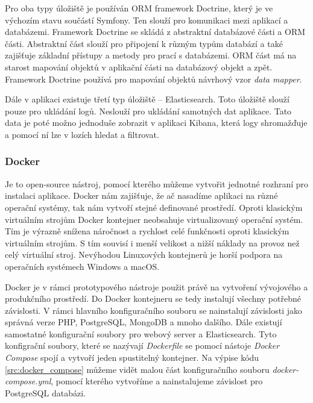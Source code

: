 \documentclass[czech,master,public,dept460,male,cpdeclaration,oneside]{diploma}
\begin{document}
Pro oba typy úložiště je používán ORM framework Doctrine, který je ve výchozím stavu součástí Symfony. Ten slouží pro komunikaci mezi aplikací a databázemi. Framework Doctrine se skládá z abstraktní databázové části  a ORM části. Abstraktní část slouží pro připojení k různým typům databází a také zajišťuje základní přístupy a metody pro prací s databázemi. ORM část má na starost mapování objektů v aplikační části na databázový objekt a zpět. Framework Doctrine používá pro mapování objektů návrhový vzor \textit{data mapper}.


Dále v aplikaci existuje třetí typ úložiště -- Elasticsearch. Toto úložiště slouží pouze pro ukládání logů. Neslouží pro ukládání samotných dat aplikace. Tato data je poté možno jednoduše zobrazit v aplikaci Kibana, která logy shromažďuje a pomocí ní lze v lozích hledat a filtrovat. 

\subsubsection{Docker}
\label{sec:docker}
Je to open-source nástroj, pomocí kterého můžeme vytvořit jednotné rozhraní pro instalaci aplikace. Docker nám zajišťuje, že ač nasadíme aplikaci na různé operační systémy, tak nám vytvoří stejné definované prostředí. Oproti klasickým virtuálním strojům Docker kontejner neobsahuje virtualizovaný operační systém. Tím je výrazně snížena náročnost a rychlost celé funkčnosti oproti klasickým virtuálním strojům. S tím souvisí i menší velikost a nižší náklady na provoz než celý virtuální stroj. Nevýhodou Linuxových kontejnerů je horší podpora na operačních systémech Windows a macOS.

Docker je v rámci prototypového nástroje použit právě na vytvoření vývojového a produkčního prostředí. Do Docker kontejneru se tedy instalují všechny potřebné závislosti. V rámci hlavního konfiguračního souboru se nainstalují závislosti jako správná verze PHP, PostgreSQL, MongoDB a mnoho dalšího. Dále existují samostatné konfigurační soubory pro webový server a Elasticsearch. Tyto konfigrační soubory, které se nazývají \textit{Dockerfile} se pomocí nástoje \textit{Docker Compose} spojí a vytvoří jeden spustitelný kontejner. Na výpise kódu \ref{src:docker_compose} můžeme vidět malou část konfiguračního souboru \textit{docker-compose.yml}, pomocí kterého vytvoříme a nainstalujeme závislost pro PostgreSQL databázi.


\end{document}
